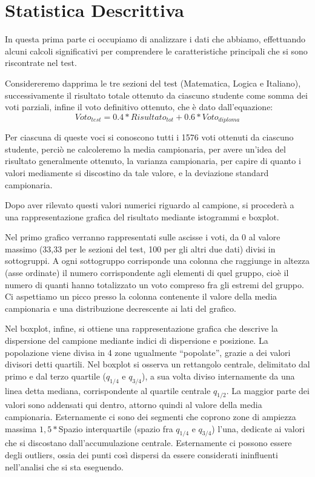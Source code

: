 \clearpage
\section{Statistica Descrittiva}

In questa prima parte ci occupiamo di analizzare i dati che abbiamo, effettuando alcuni calcoli significativi per comprendere le caratteristiche principali che si sono riscontrate nel test.

Considereremo dapprima le tre sezioni del test (Matematica, Logica e Italiano), successivamente il risultato totale ottenuto da ciascuno studente come somma dei voti parziali, infine il voto definitivo ottenuto, che è dato dall’equazione:
\[
Voto_{test} = 0.4 * Risultato_{tot} + 0.6 * Voto_{diploma}
\]

Per ciascuna di queste voci si conoscono tutti i 1576 voti ottenuti da ciascuno
studente, perciò ne calcoleremo la media campionaria, per avere un’idea del
risultato generalmente ottenuto, la varianza campionaria, per capire di quanto i
valori mediamente si discostino da tale valore, e la deviazione standard
campionaria.

Dopo aver rilevato questi valori numerici riguardo al campione, si procederà a una
rappresentazione grafica del risultato mediante istogrammi e boxplot.

Nel primo grafico verranno rappresentati sulle ascisse i voti, da 0 al valore massimo (33,33 per le sezioni del test, 100 per gli altri due dati) divisi in sottogruppi.
A ogni sottogruppo corrisponde una colonna che raggiunge in altezza (asse ordinate) 
  il numero corrispondente agli elementi di quel gruppo, cioè il numero di quanti hanno
 totalizzato un voto compreso fra gli estremi del gruppo.
Ci aspettiamo un picco presso la colonna contenente il valore della media campionaria e una distribuzione decrescente ai lati del grafico.

Nel boxplot, infine, si ottiene una rappresentazione grafica che descrive la dispersione del campione mediante indici di dispersione e posizione. La popolazione viene divisa in 4 zone ugualmente “popolate”, grazie a dei valori divisori detti quartili. Nel boxplot si osserva un rettangolo centrale, delimitato dal primo e dal terzo quartile ($q_{1/4}$ e $q_{3/4}$), a sua volta diviso internamente da una linea detta mediana, corrispondente al quartile centrale $q_{1/2}$. La maggior parte dei valori sono addensati qui dentro, attorno quindi al valore della media campionaria. Esternamente ci sono dei segmenti che coprono zone di ampiezza massima $1,5* $Spazio interquartile (spazio fra $q_{1/4}$ e $q_{3/4}$) l’una, dedicate ai valori che si discostano dall’accumulazione centrale. Esternamente ci possono essere degli outliers, ossia dei punti così dispersi da essere considerati ininfluenti nell’analisi che si sta eseguendo. 

